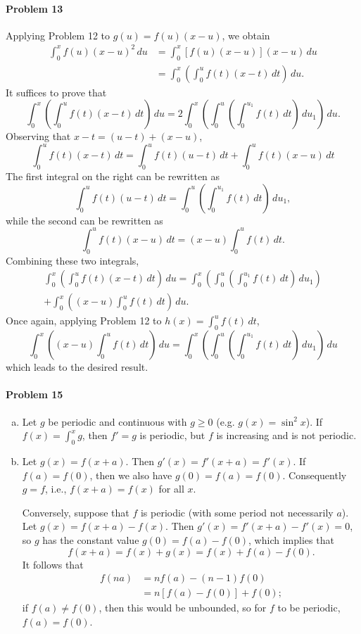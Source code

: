 \documentclass{article}
\begin{document}
\paragraph{Problem 13} Applying Problem 12 to $g(u) = f(u)(x - u)$, we obtain
\begin{align*}
  \int_0^x f(u)(x - u)^2 \,du
  &= \int_0^x [f(u)(x - u)](x - u) \,du \\
  &= \int_0^x \left(\int_0^u f(t)(x - t) \,dt\right) \,du.
\end{align*}
It suffices to prove that \[
  \int_0^x \left( \int_0^u f(t)(x - t) \,dt \right) \,du
  = 2\int_0^x \left(
    \int_0^u \left( \int_0^{u_1} f(t) \,dt \right)
  \,du_1 \right) \,du.
\] Observing that $x - t = (u - t) + (x - u)$, \[
  \int_0^u f(t)(x - t) \,dt
  = \int_0^u f(t)(u - t) \,dt + \int_0^u f(t)(x - u) \,dt
\] The first integral on the right can be rewritten as \[
  \int_0^u f(t)(u - t) \,dt
  = \int_0^u \left( \int_0^{u_1} f(t) \,dt \right) \,du_1,
\] while the second can be rewritten as \[
  \int_0^u f(t)(x - u) \,dt = (x - u)\int_0^u f(t) \,dt.
\] Combining these two integrals,
\begin{multline*}
  \int_0^x \left(\int_0^u f(t)(x - t) \,dt\right) \,du
  = \int_0^x \left(
    \int_0^u \left(\int_0^{u_1} f(t) \,dt\right) \,du_1
  \right) \\
  + \int_0^x \left(
    (x - u) \int_0^u f(t) \,dt
  \right) \,du.
\end{multline*}
Once again, applying Problem 12 to $h(x) = \int_0^u f(t) \,dt$, \[
  \int_0^x \left((x - u)\int_0^u f(t) \,dt\right) \,du
  = \int_0^x \left(
    \int_0^u \left( \int_0^{u_1} f(t) \,dt \right) \,du_1
  \right) \,du
\] which leads to the desired result.

\paragraph{Problem 15}
\begin{enumerate}[(b)]
  \item Let $g$ be periodic and continuous with $g \geq 0$ (e.g. $g(x) =
    \sin^2 x$). If $f(x) = \int_0^x g$, then $f' = g$ is periodic, but $f$ is
    increasing and is not periodic.
  \item Let $g(x) = f(x + a)$. Then $g'(x) = f'(x + a) = f'(x)$. If $f(a) =
    f(0)$, then we also have $g(0) = f(a) = f(0)$. Consequently $g = f$, i.e.,
    $f(x + a) = f(x)$ for all $x$.

    Conversely, suppose that $f$ is periodic (with some period not necessarily
    $a$). Let $g(x) = f(x + a) - f(x)$. Then $g'(x) = f'(x + a) - f'(x) = 0$,
    so $g$ has the constant value $g(0) = f(a) - f(0)$, which implies that \[
      f(x + a) = f(x) + g(x) = f(x) + f(a) - f(0).
    \] It follows that
    \begin{align*}
      f(na) &= nf(a) - (n - 1)f(0) \\
            &= n[f(a) - f(0)] + f(0);
    \end{align*}
    if $f(a) \neq f(0)$, then this would be unbounded, so for $f$ to be
    periodic, $f(a) = f(0)$.
\end{enumerate}
\end{document}
